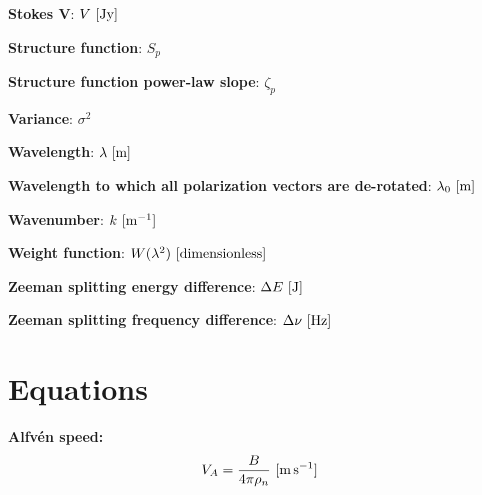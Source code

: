 \documentclass[a4paper,11pt]{article}
\begin{document}
{\noindent}\textbf{Stokes V}: $V ~ [\rm Jy]$

{\noindent}\textbf{Structure function}: $S_p$

{\noindent}\textbf{Structure function power-law slope}: $\zeta_p$

{\noindent}\textbf{Variance}: $\sigma^2$

{\noindent}\textbf{Wavelength}: $\lambda~[{\rm m}]$

{\noindent}\textbf{Wavelength to which all polarization vectors are de-rotated}: $\lambda_0~[{\rm m}]$

{\noindent}\textbf{Wavenumber}: $k~[{\rm m^{-1}}]$

{\noindent}\textbf{Weight function}: $W(\lambda^2)~[\rm{dimensionless}]$

{\noindent}\textbf{Zeeman splitting energy difference}: $\Delta E ~ [{\rm J}]$

{\noindent}\textbf{Zeeman splitting frequency difference}: $\Delta \nu ~ [{\rm Hz}]$









































\newpage
\section{Equations}

{\noindent}\textbf{Alfv\'en speed:}
\begin{align*}
    V_A = \dfrac{B}{4\pi\rho_n} ~ [{\rm m\,s^{-1}}]
\end{align*}
\end{document}
